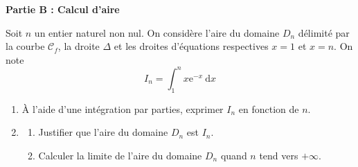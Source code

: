 \documentclass[10pt]{article}
\providecommand{\e}{{\mathrm{e}}}
\begin{document}
\bigskip

\textbf{Partie B : Calcul d'aire}

\medskip

	Soit $n$ un entier naturel non nul. On considère l'aire du domaine $D_{n}$ délimité par la courbe $\mathcal{C}_{f}$, la droite $\Delta$ et les droites d'équations respectives $x=1$ et $x=n$. On note
		\[	I_{n}=\int_{1}^{n} x \e^{-x} \mathrm{~d} x	\]

	\begin{enumerate}
	\item À l'aide d'une intégration par parties, exprimer $I_{n}$ en fonction de $n$.
	\item \begin{enumerate}
		\item Justifier que l'aire du domaine $D_{n}$ est $I_{n}$.

		\item Calculer la limite de l'aire du domaine $D_{n}$ quand $n$ tend vers $+\infty$.
	\end{enumerate}
	\end{enumerate}
\end{document}
